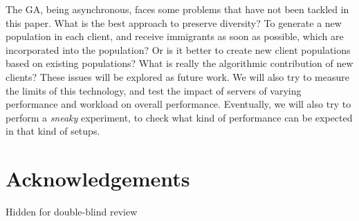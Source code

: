 \documentclass[runningheads,a4paper]{llncs}
\begin{document}
The GA, being asynchronous, faces some problems that have not been
tackled in this paper. What is the best approach to preserve
diversity? To generate a new population in each client, and receive
immigrants as soon as possible, which are incorporated into the
population? Or is it better to create new client populations based on
existing populations? What is really the algorithmic contribution of
new clients? These issues will be explored as future work. 
We will also try to measure the limits of this technology, and test
the impact of servers of varying performance and workload on overall
performance. Eventually, we will also try to perform a {\em sneaky}
experiment, to check what kind of performance can be expected in that
kind of setups. 

\section*{Acknowledgements}

Hidden for double-blind review




\end{document}
